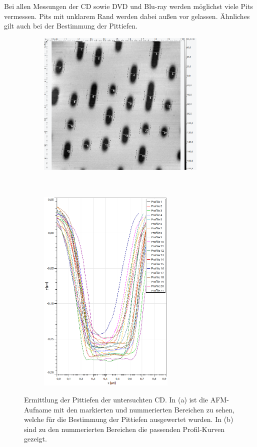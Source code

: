 Bei allen Messungen der CD sowie DVD und Blu-ray werden m\"oglichst viele Pits vermessen.
Pits mit unklarem Rand werden dabei au{\ss}en vor gelassen.
\"Ahnliches gilt auch bei der Bestimmung der Pittiefen.
\begin{figure}[H]
\centering
	\begin{subfigure}[t]{0.45\textwidth}
	\includegraphics[height=7cm]{AFM_auswertung/cd_tiefe.png}
	\caption{}
	\end{subfigure}
	~
	\begin{subfigure}[t]{0.45\textwidth}
	\includegraphics[height=10cm]{AFM_auswertung/cd_tiefe_grafik.png}
	\caption{}
	\label{abb:cd_tiefe}
	\end{subfigure}
\caption{Ermittlung der Pittiefen der untersuchten CD. In (a) ist die AFM-Aufname mit den markierten und nummerierten Bereichen zu sehen, welche f\"ur die Bestimmung der Pittiefen ausgewertet wurden. In (b) sind zu den nummerierten Bereichen die passenden Profil-Kurven gezeigt.}
\label{abb:pit_tiefe_cd}
\end{figure}
